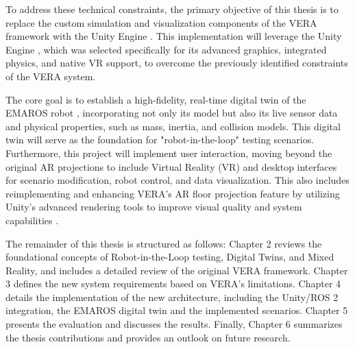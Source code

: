 To address these technical constraints, the primary objective of this thesis is to replace the custom simulation and visualization components of the VERA framework \cite{Geh24} with the Unity Engine \cite{Uni23}. This implementation will leverage the Unity Engine \cite{Uni23}, which was selected specifically for its advanced graphics, integrated physics, and native VR support, to overcome the previously identified constraints of the VERA system.

The core goal is to establish a high-fidelity, real-time digital twin \cite{AA23} of the EMAROS robot \cite{Geh24}, incorporating not only its model but also its live sensor data and physical properties, such as mass, inertia, and collision models. This digital twin will serve as the foundation for "robot-in-the-loop" \cite{Hu05} testing scenarios. Furthermore, this project will implement user interaction, moving beyond the original AR projections \cite{Geh24} to include Virtual Reality (VR) \cite{EM21} and desktop interfaces for scenario modification, robot control, and data visualization. This also includes reimplementing and enhancing VERA's AR floor projection feature by utilizing Unity's advanced rendering tools to improve visual quality and system capabilities \cite{Uni23}.

\cite{NOT FINAL}The remainder of this thesis is structured as follows: Chapter 2 reviews the foundational concepts of Robot-in-the-Loop testing, Digital Twins, and Mixed Reality, and includes a detailed review of the original VERA framework. Chapter 3 defines the new system requirements based on VERA's limitations. Chapter 4 details the implementation of the new architecture, including the Unity/ROS 2 integration, the EMAROS digital twin and the implemented scenarios. Chapter 5 presents the evaluation and discusses the results. Finally, Chapter 6 summarizes the thesis contributions and provides an outlook on future research.\cite{NOT FINAL}

